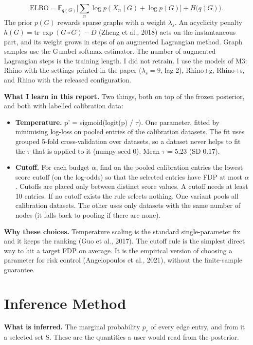 \documentclass[10pt]{article}
\begin{document}
\begin{equation}\mathrm{ELBO}=\mathbb{E}_{q(G)}\Big[\sum_{n}\log p(X_n\mid G)+\log p(G)\Big]+H\big(q(G)\big).\end{equation}
The prior $p(G)$ rewards sparse graphs with a weight $\lambda_s$. An acyclicity penalty $h(G)=\mathrm{tr}\,\exp(G\circ G)-D$ (Zheng et al., 2018) acts on the instantaneous part, and its weight grows in steps of an augmented Lagrangian method. Graph samples use the Gumbel-softmax estimator. The number of augmented Lagrangian steps is the training length. I did not retrain. I use the models of M3: Rhino with the settings printed in the paper ($\lambda_s=9$, lag 2), Rhino+g, Rhino+s, and Rhino with the released configuration.

\textbf{What I learn in this report.} Two things, both on top of the frozen posterior, and both with labelled calibration data:

\begin{itemize}
\item \textbf{Temperature.} p' = sigmoid(logit(p) / $\tau$). One parameter, fitted by minimising log-loss on pooled entries of the calibration datasets. The fit uses grouped 5-fold cross-validation over datasets, so a dataset never helps to fit the $\tau$ that is applied to it (numpy seed 0). Mean $\tau$ = 5.23 (SD 0.17).
\item \textbf{Cutoff.} For each budget $\alpha$, find on the pooled calibration entries the lowest score cutoff (on the log-odds) so that the selected entries have FDP at most $\alpha$. Cutoffs are placed only between distinct score values. A cutoff needs at least 10 entries. If no cutoff exists the rule selects nothing. One variant pools all calibration datasets. The other uses only datasets with the same number of nodes (it falls back to pooling if there are none).
\end{itemize}
\textbf{Why these choices.} Temperature scaling is the standard single-parameter fix and it keeps the ranking (Guo et al., 2017). The cutoff rule is the simplest direct way to hit a target FDP on average. It is the empirical version of choosing a parameter for risk control (Angelopoulos et al., 2021), without the finite-sample guarantee.

\section{Inference Method}
\textbf{What is inferred.} The marginal probability $p_{e}$ of every edge entry, and from it a selected set S. These are the quantities a user would read from the posterior.
\end{document}
